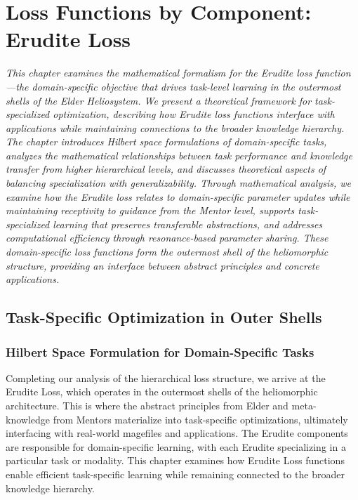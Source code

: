 \chapter{Loss Functions by Component: Erudite Loss}

\textit{This chapter examines the mathematical formalism for the Erudite loss function—the domain-specific objective that drives task-level learning in the outermost shells of the Elder Heliosystem. We present a theoretical framework for task-specialized optimization, describing how Erudite loss functions interface with applications while maintaining connections to the broader knowledge hierarchy. The chapter introduces Hilbert space formulations of domain-specific tasks, analyzes the mathematical relationships between task performance and knowledge transfer from higher hierarchical levels, and discusses theoretical aspects of balancing specialization with generalizability. Through mathematical analysis, we examine how the Erudite loss relates to domain-specific parameter updates while maintaining receptivity to guidance from the Mentor level, supports task-specialized learning that preserves transferable abstractions, and addresses computational efficiency through resonance-based parameter sharing. These domain-specific loss functions form the outermost shell of the heliomorphic structure, providing an interface between abstract principles and concrete applications.}

\section{Task-Specific Optimization in Outer Shells}

\subsection{Hilbert Space Formulation for Domain-Specific Tasks}

Completing our analysis of the hierarchical loss structure, we arrive at the Erudite Loss, which operates in the outermost shells of the heliomorphic architecture. This is where the abstract principles from Elder and meta-knowledge from Mentors materialize into task-specific optimizations, ultimately interfacing with real-world magefiles and applications. The Erudite components are responsible for domain-specific learning, with each Erudite specializing in a particular task or modality. This chapter examines how Erudite Loss functions enable efficient task-specific learning while remaining connected to the broader knowledge hierarchy.

